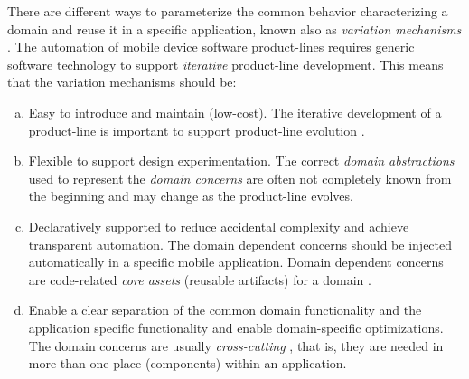 There are different ways to parameterize the common behavior characterizing a domain and reuse it in a specific application, known also as \textit{variation mechanisms} \cite{pl.00}. The automation of mobile device software product-lines requires generic software technology to support \textit{iterative}  product-line development. This means that the variation mechanisms should be:
\begin{enumerate}[a.]
\item Easy to introduce and maintain (low-cost). The iterative development of a product-line is important to support product-line evolution \cite{Pussinen.2002}.  
\item Flexible to support design experimentation. The correct \textit{domain abstractions} used to represent the \textit{domain concerns} are often not completely known from the beginning and may change as the product-line evolves.
\item Declaratively supported to reduce accidental complexity \cite{brooks.87} and achieve transparent automation.
%
The domain dependent concerns should be injected automatically in a specific mobile application. Domain dependent concerns are code-related \textit{core assets} (reusable artifacts) for a domain \cite{pl.02}. 
\item Enable a clear separation of the common domain functionality and the application specific functionality and enable domain-specific optimizations. The domain concerns are usually \textit{cross-cutting} \cite{kiczalesetal.97}, that is, they are needed in more than one place (components) within an application.
\end{enumerate}

